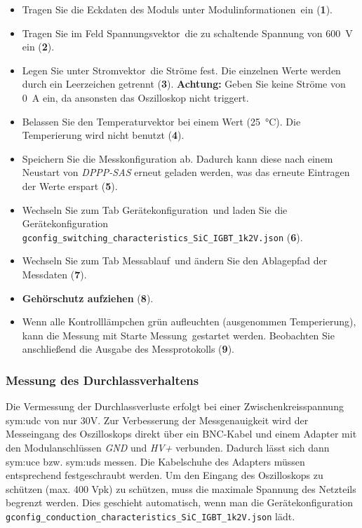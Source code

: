 \begin{itemize}
	
	\item Tragen Sie die Eckdaten des Moduls unter \glqq Modulinformationen\grqq \, ein (\textbf{1}).
	
	\item Tragen Sie im Feld \glqq Spannungsvektor\grqq \, die zu schaltende Spannung von \SI{600}{\volt} ein (\textbf{2}).
	
	\item Legen Sie unter \glqq Stromvektor\grqq \, die Ströme fest. Die einzelnen Werte werden durch ein Leerzeichen getrennt (\textbf{3}).
	\textbf{Achtung:} Geben Sie keine Ströme von \SI{0}{\ampere} ein, da ansonsten das Oszilloskop nicht triggert.
	
	\item Belassen Sie den Temperaturvektor bei einem Wert (\SI{25}{\celsius}). Die Temperierung wird nicht benutzt (\textbf{4}).
	
	\item Speichern Sie die Messkonfiguration ab. Dadurch kann diese nach einem Neustart von \textit{DPPP-SAS} erneut geladen werden, was das erneute
	Eintragen der Werte erspart (\textbf{5}).
	
	\item Wechseln Sie zum Tab \glqq Gerätekonfiguration\grqq \, und laden Sie die Gerätekonfiguration \glqq\verb|gconfig_switching_characteristics_SiC_IGBT_1k2V.json|\grqq{} (\textbf{6}).

	\item Wechseln Sie zum Tab \glqq Messablauf\grqq \, und ändern Sie den Ablagepfad der Messdaten (\textbf{7}).
	
	\item \textbf{Gehörschutz aufziehen} (\textbf{8}). 
	
	\item Wenn alle Kontrolllämpchen grün aufleuchten (ausgenommen Temperierung), kann die Messung mit \glqq Starte Messung\grqq \, gestartet werden.
	Beobachten Sie anschließend die Ausgabe des Messprotokolls (\textbf{9}).
\end{itemize}


\subsubsection{Messung des Durchlassverhaltens}

Die Vermessung der Durchlassverluste erfolgt bei einer Zwischenkreisspannung \gls{sym:udc} von nur 30V. 
Zur Verbesserung der Messgenauigkeit wird der Messeingang des Oszilloskops direkt über ein BNC-Kabel und einem Adapter mit den 
Modulanschlüssen \textit{GND} und \textit{HV+} verbunden. Dadurch lässt sich dann \gls{sym:uce} bzw. \gls{sym:uds} messen. 
Die Kabelschuhe des Adapters müssen entsprechend festgeschraubt werden. 
Um den Eingang des Oszilloskops zu schützen (max. 400 Vpk) zu schützen, muss die maximale Spannung des Netzteils begrenzt werden. 
Dies geschieht automatisch, wenn man die Gerätekonfiguration \glqq\verb|gconfig_conduction_characteristics_SiC_IGBT_1k2V.json|\grqq{} lädt.

